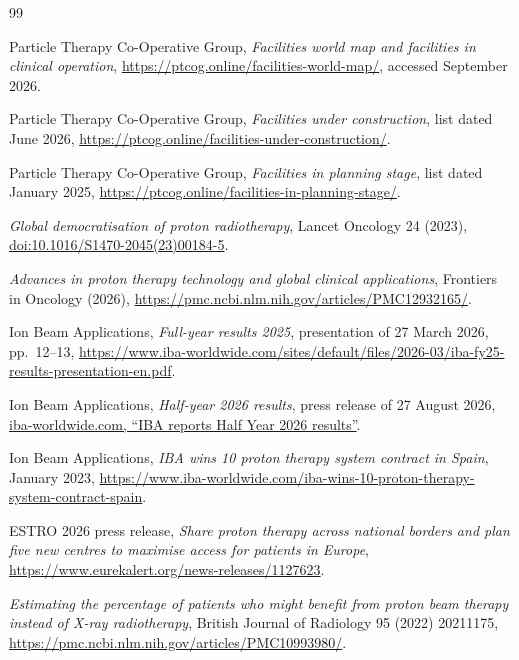\documentclass[11pt,a4paper]{article}
\begin{document}
\begin{thebibliography}{99}

 Particle Therapy Co-Operative Group, \emph{Facilities world
map and facilities in clinical operation},
\url{https://ptcog.online/facilities-world-map/}, accessed September 2026.

 Particle Therapy Co-Operative Group,
\emph{Facilities under construction}, list dated June 2026,
\url{https://ptcog.online/facilities-under-construction/}.

 Particle Therapy Co-Operative Group,
\emph{Facilities in planning stage}, list dated January 2025,
\url{https://ptcog.online/facilities-in-planning-stage/}.

 \emph{Global democratisation of proton radiotherapy},
Lancet Oncology 24 (2023),
\href{https://www.thelancet.com/journals/lanonc/article/PIIS1470-2045(23)00184-5/abstract}{doi:10.1016/S1470-2045(23)00184-5}.

 \emph{Advances in proton therapy technology and global
clinical applications}, Frontiers in Oncology (2026),
\url{https://pmc.ncbi.nlm.nih.gov/articles/PMC12932165/}.

 Ion Beam Applications, \emph{Full-year results 2025},
presentation of 27 March 2026, pp.~12--13,
\url{https://www.iba-worldwide.com/sites/default/files/2026-03/iba-fy25-results-presentation-en.pdf}.

 Ion Beam Applications, \emph{Half-year 2026 results},
press release of 27 August 2026,
\href{https://www.iba-worldwide.com/iba-reports-half-year-2026-results-track-its-improved-profitability-trajectory}{iba-worldwide.com, ``IBA reports Half Year 2026 results''}.

 Ion Beam Applications, \emph{IBA wins 10 proton therapy
system contract in Spain}, January 2023,
\url{https://www.iba-worldwide.com/iba-wins-10-proton-therapy-system-contract-spain}.

 ESTRO 2026 press release, \emph{Share proton therapy across
national borders and plan five new centres to maximise access for patients in
Europe}, \url{https://www.eurekalert.org/news-releases/1127623}.

 \emph{Estimating the percentage of patients who might benefit
from proton beam therapy instead of X-ray radiotherapy}, British Journal of
Radiology 95 (2022) 20211175,
\url{https://pmc.ncbi.nlm.nih.gov/articles/PMC10993980/}.

\end{thebibliography}
\end{document}
